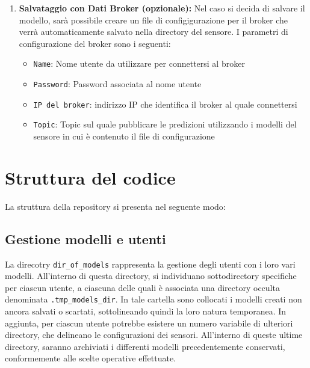 \documentclass[a4paper,10pt]{article}
\begin{document}
\begin{enumerate}
  \item \textbf{Salvataggio con Dati Broker (opzionale):} Nel caso si decida di salvare il modello, sarà possibile creare un file di configigurazione 
  per il broker che verrà automaticamente salvato nella directory del sensore.  I parametri di configurazione del broker sono i seguenti:
  
  \begin{itemize}
    \item \texttt{Name}: Nome utente da utilizzare per connettersi al broker
    \item \texttt{Password}: Password associata al nome utente
    \item \texttt{IP del broker}: indirizzo IP che identifica il broker al quale connettersi
    \item \texttt{Topic}: Topic sul quale pubblicare le predizioni utilizzando i modelli del sensore in cui è contenuto il file di configurazione
  \end{itemize}
\end{enumerate}

\section{Struttura del codice}
La struttura della repository si presenta nel seguente modo:


\subsection{Gestione modelli e utenti}
La direcotry \texttt{dir\_of\_models} rappresenta la gestione degli utenti con i loro vari modelli.
All'interno di questa directory, si individuano sottodirectory specifiche per ciascun utente, 
a ciascuna delle quali è associata una directory occulta denominata \texttt{.tmp\_models\_dir}. In tale cartella sono collocati i modelli creati
non ancora salvati o scartati, sottolineando quindi la loro natura temporanea.
In aggiunta, per ciascun utente potrebbe esistere un numero variabile di ulteriori directory, che delineano le configurazioni dei sensori. 
All'interno di queste ultime directory, saranno archiviati i differenti modelli precedentemente conservati, conformemente alle scelte operative effettuate.
\end{document}
